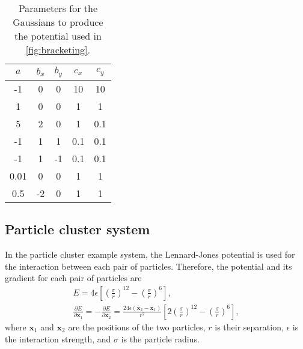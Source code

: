 \documentclass[aip,jcp,reprint,twocolumn]{revtex4-1}
\begin{document}
\begin{table}[ht]
  \begin{ruledtabular}
  \begin{tabular}{ccccc}
    $a$  & $b_x$ & $b_y$ & $c_x$ & $c_y$ \\
    \hline
    -1   &   0   &   0   &  10   &  10   \\
     1   &   0   &   0   &   1   &   1   \\
     5   &   2   &   0   &   1   &  0.1  \\
    -1   &   1   &   1   &  0.1  &  0.1  \\
    -1   &   1   &  -1   &  0.1  &  0.1  \\
    0.01 &   0   &   0   &   1   &   1   \\
    0.5  &  -2   &   0   &   1   &   1   \\
  \end{tabular}
  \end{ruledtabular}
  \caption{\label{tab:bracketingparams}
    Parameters for the Gaussians to produce the potential used in \cref{fig:bracketing}.
  }
\end{table}

\subsection{Particle cluster system}
In the particle cluster example system, the Lennard-Jones potential is used for the interaction between each pair of particles.
Therefore, the potential and its gradient for each pair of particles are
\begin{gather}
  E = 4\epsilon \left[ \left(\frac{\sigma}{r}\right)^{12} - \left(\frac{\sigma}{r}\right)^6 \right], \\
  \frac{\partial E}{\partial \bm{x}_1} = -\frac{\partial E}{\partial \bm{x}_2} =
    \frac{24 \epsilon (\bm{x}_2 - \bm{x}_1)}{r^2} \left[ 2 \left(\frac{\sigma}{r}\right)^{12} - \left(\frac{\sigma}{r}\right)^6 \right],
\end{gather}
where $\bm{x}_1$ and $\bm{x}_2$ are the positions of the two particles, $r$ is their separation, $\epsilon$ is the interaction strength, and $\sigma$ is the particle radius.
\end{document}
